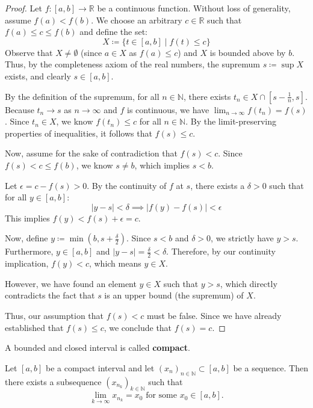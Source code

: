 \begin{proof}
    Let $f: [a, b] \to \mathbb{R}$ be a continuous function. Without loss of generality, assume $f(a) < f(b)$. We choose an arbitrary $c \in \mathbb{R}$ such that $f(a) \leq c \leq f(b)$ and define the set:
    $$X \coloneqq \{t \in [a, b] \mid f(t) \leq c\}$$
    Observe that $X \neq \emptyset$ (since $a \in X$ as $f(a) \leq c$) and $X$ is bounded above by $b$. Thus, by the completeness axiom of the real numbers, the supremum $s \coloneqq \sup X$ exists, and clearly $s \in [a, b]$.

    By the definition of the supremum, for all $n \in \mathbb{N}$, there exists $t_n \in X \cap [s - \frac{1}{n}, s]$. 
    Because $t_n \to s$ as $n \to \infty$ and $f$ is continuous, we have $\lim_{n\to\infty} f(t_n) = f(s)$. 
    Since $t_n \in X$, we know $f(t_n) \leq c$ for all $n \in \mathbb{N}$. By the limit-preserving properties of inequalities, it follows that $f(s) \leq c$.

    Now, assume for the sake of contradiction that $f(s) < c$. 
    Since $f(s) < c \leq f(b)$, we know $s \neq b$, which implies $s < b$. 

    Let $\epsilon = c - f(s) > 0$. By the continuity of $f$ at $s$, there exists a $\delta > 0$ such that for all $y \in [a, b]$:
    $$|y - s| < \delta \implies |f(y) - f(s)| < \epsilon$$
    This implies $f(y) < f(s) + \epsilon = c$. 

    Now, define $y \coloneqq \min(b, s + \frac{\delta}{2})$. 
    Since $s < b$ and $\delta > 0$, we strictly have $y > s$. Furthermore, $y \in [a, b]$ and $|y - s| = \frac{\delta}{2} < \delta$. 
    Therefore, by our continuity implication, $f(y) < c$, which means $y \in X$. 

    However, we have found an element $y \in X$ such that $y > s$, which directly contradicts the fact that $s$ is an upper bound (the supremum) of $X$. 

    Thus, our assumption that $f(s) < c$ must be false. Since we have already established that $f(s) \leq c$, we conclude that $f(s) = c$.
\end{proof}


\begin{definition}
A bounded and closed interval is called \textbf{compact}.
\end{definition}

\begin{lemma}
    Let $[a, b]$ be a compact interval and let $(x_n)_{n\in\mathbb{N}} \subset [a, b]$ be a sequence. Then there exists a subsequence $(x_{n_k})_{k\in\mathbb{N}}$ such that 
    $$\lim_{k\to\infty} x_{n_k} = x_0 \text{ for some } x_0 \in [a, b].$$
\end{lemma}

